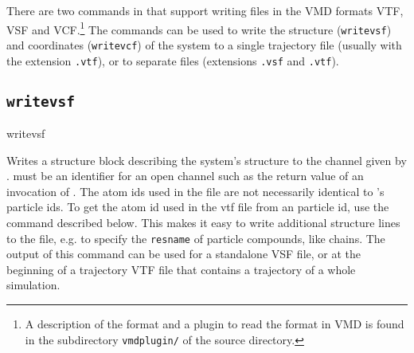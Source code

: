 There are two commands in \es{} that support writing files in the VMD
formats VTF, VSF and VCF.\footnote{A description of the format and a
  plugin to read the format in VMD is found in the subdirectory
  \texttt{vmdplugin/} of the \es{} source directory.} The commands can
be used to write the structure (\texttt{writevsf}) and coordinates
(\texttt{writevcf}) of the system to a single trajectory file (usually
with the extension \texttt{.vtf}), or to separate files (extensions
\texttt{.vsf} and \texttt{.vtf}).

\subsection{\texttt{writevsf}}

\begin{essyntax}
  writevsf  
\end{essyntax}
Writes a structure block describing the system's structure to the
channel given by .  must be an
identifier for an open channel such as the return value of an
invocation of . The atom ids used in the file are not
necessarily identical to \es's particle ids. To get the atom id used
in the vtf file from an \es particle id, use the command
 described below. This makes it easy to write
additional structure lines to the file, e.g. to specify the
\texttt{resname} of particle compounds, like chains.  The output of
this command can be used for a standalone VSF file, or at the
beginning of a trajectory VTF file that contains a trajectory of a
whole simulation.


